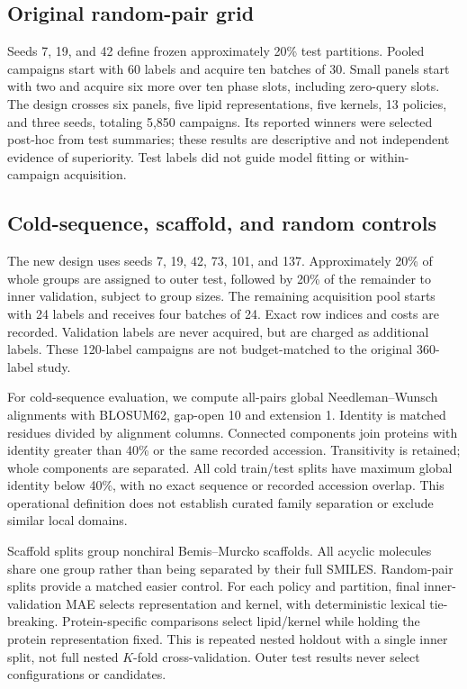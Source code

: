 \documentclass[wcp]{jmlr}
\begin{document}
\subsection{Original random-pair grid}
Seeds 7, 19, and 42 define frozen approximately 20\% test partitions. Pooled
campaigns start with 60 labels and acquire ten batches of 30. Small panels
start with two and acquire six more over ten phase slots, including zero-query
slots. The design crosses six panels, five lipid representations, five
kernels, 13 policies, and three seeds, totaling 5,850 campaigns. Its reported
winners were selected post-hoc from test summaries; these results are
descriptive and not independent evidence of superiority. Test labels did not
guide model fitting or within-campaign acquisition.

\subsection{Cold-sequence, scaffold, and random controls}
The new design uses seeds 7, 19, 42, 73, 101, and 137. Approximately 20\% of
whole groups are assigned to outer test, followed by 20\% of the remainder to
inner validation, subject to group sizes. The remaining acquisition pool
starts with 24 labels and receives four batches of 24. Exact row indices and
costs are recorded. Validation labels are never acquired, but are charged
as additional labels. These 120-label campaigns are not budget-matched to
the original 360-label study.

For cold-sequence evaluation, we compute all-pairs global Needleman--Wunsch
alignments with BLOSUM62, gap-open 10 and extension 1. Identity is matched
residues divided by alignment columns. Connected components join proteins
with identity greater than 40\% or the same recorded accession. Transitivity
is retained; whole components are separated. All cold train/test splits have
maximum global identity below 40\%, with no exact sequence or recorded
accession overlap. This operational definition does not establish curated
family separation or exclude similar local domains.

Scaffold splits group nonchiral Bemis--Murcko scaffolds. All acyclic molecules
share one group rather than being separated by their full SMILES. Random-pair
splits provide a matched easier control. For each policy and partition, final
inner-validation MAE selects representation and kernel, with deterministic
lexical tie-breaking. Protein-specific comparisons select lipid/kernel while
holding the protein representation fixed. This is repeated nested holdout
with a single inner split, not full nested $K$-fold cross-validation. Outer
test results never select configurations or candidates.
\end{document}
